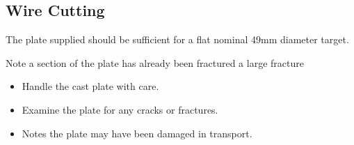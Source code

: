 \subsection{Wire Cutting}
The plate supplied should be sufficient for a flat nominal 49mm diameter target.

Note a section of the plate has already been fractured a large fracture 
\begin{itemize}
\item Handle the cast plate with care. 
\item Examine the plate for any cracks or fractures. 
\item Notes the plate may have been damaged in transport. 
\end{itemize}